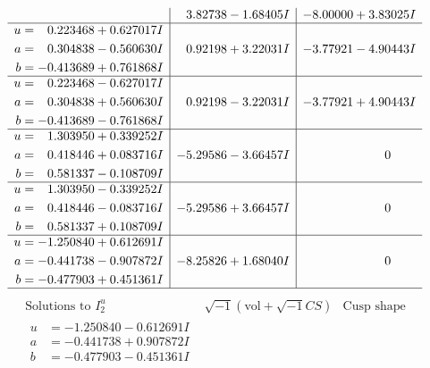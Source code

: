 \documentclass[1p]{elsarticle_modified}
\theoremstyle{definition}
\newcommand{\I}{\sqrt{-1}}
\begin{document}
$$\begin{array}{c|c|c}
 & \phantom{-}3.82738 - 1.68405 I & -8.00000 + 3.83025 I \\ \hline\begin{aligned}
u &= \phantom{-}0.223468 + 0.627017 I \\
a &= \phantom{-}0.304838 - 0.560630 I \\
b &= -0.413689 + 0.761868 I\end{aligned}
 & \phantom{-}0.92198 + 3.22031 I & -3.77921 - 4.90443 I \\ \hline\begin{aligned}
u &= \phantom{-}0.223468 - 0.627017 I \\
a &= \phantom{-}0.304838 + 0.560630 I \\
b &= -0.413689 - 0.761868 I\end{aligned}
 & \phantom{-}0.92198 - 3.22031 I & -3.77921 + 4.90443 I \\ \hline\begin{aligned}
u &= \phantom{-}1.303950 + 0.339252 I \\
a &= \phantom{-}0.418446 + 0.083716 I \\
b &= \phantom{-}0.581337 - 0.108709 I\end{aligned}
 & -5.29586 - 3.66457 I & \phantom{-0.000000 } 0 \\ \hline\begin{aligned}
u &= \phantom{-}1.303950 - 0.339252 I \\
a &= \phantom{-}0.418446 - 0.083716 I \\
b &= \phantom{-}0.581337 + 0.108709 I\end{aligned}
 & -5.29586 + 3.66457 I & \phantom{-0.000000 } 0 \\ \hline\begin{aligned}
u &= -1.250840 + 0.612691 I \\
a &= -0.441738 - 0.907872 I \\
b &= -0.477903 + 0.451361 I\end{aligned}
 & -8.25826 + 1.68040 I & \phantom{-0.000000 } 0\\
 \hline 
 \end{array}$$\newpage$$\begin{array}{c|c|c}  
\text{Solutions to }I^u_{2}& \I (\text{vol} + \sqrt{-1}CS) & \text{Cusp shape}\\
 \hline 
\begin{aligned}
u &= -1.250840 - 0.612691 I \\
a &= -0.441738 + 0.907872 I \\
b &= -0.477903 - 0.451361 I\end{aligned}

\end{array}$$
\end{document}
